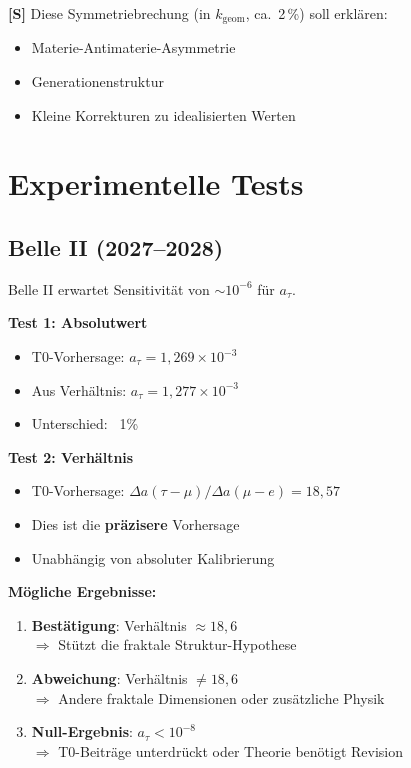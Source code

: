 	\textbf{[S]} Diese Symmetriebrechung (in $k_\text{geom}$, ca.\ 2\,\%) soll erklären:
	\begin{itemize}
		\item Materie-Antimaterie-Asymmetrie
		\item Generationenstruktur
		\item Kleine Korrekturen zu idealisierten Werten
	\end{itemize}
	
	\section{Experimentelle Tests}
	
	\subsection{Belle II (2027--2028)}
	
	Belle II erwartet Sensitivität von $\sim 10^{-6}$ für $a_\tau$.
	
	\textbf{Test 1: Absolutwert}
	\begin{itemize}
		\item T0-Vorhersage: $a_\tau = 1{,}269 \times 10^{-3}$
		\item Aus Verhältnis: $a_\tau = 1{,}277 \times 10^{-3}$
		\item Unterschied: ~1\%
	\end{itemize}
	
	\textbf{Test 2: Verhältnis}
	\begin{itemize}
		\item T0-Vorhersage: $\Delta a(\tau - \mu) / \Delta a(\mu - e) = 18{,}57$
		\item Dies ist die \textbf{präzisere} Vorhersage
		\item Unabhängig von absoluter Kalibrierung
	\end{itemize}
	
	\textbf{Mögliche Ergebnisse:}
	\begin{enumerate}
		\item \textbf{Bestätigung}: Verhältnis $\approx 18{,}6$ \\
		$\Rightarrow$ Stützt die fraktale Struktur-Hypothese
		
		\item \textbf{Abweichung}: Verhältnis $\neq 18{,}6$ \\
		$\Rightarrow$ Andere fraktale Dimensionen oder zusätzliche Physik
		
		\item \textbf{Null-Ergebnis}: $a_\tau < 10^{-8}$ \\
		$\Rightarrow$ T0-Beiträge unterdrückt oder Theorie benötigt Revision
	\end{enumerate}
	
